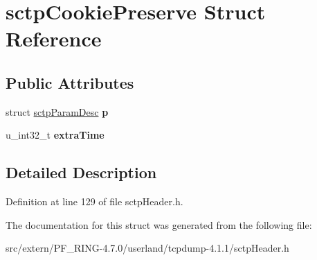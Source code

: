 \hypertarget{structsctp_cookie_preserve}{
\section{sctpCookiePreserve Struct Reference}
\label{structsctp_cookie_preserve}
}
\subsection*{Public Attributes}
\begin{DoxyCompactItemize}
\item 
\hypertarget{structsctp_cookie_preserve_aec11f9dd1f0b9243c11c99002ec5e2db}{
struct \hyperlink{structsctp_param_desc}{sctpParamDesc} {\bfseries p}}
\label{structsctp_cookie_preserve_aec11f9dd1f0b9243c11c99002ec5e2db}

\item 
\hypertarget{structsctp_cookie_preserve_a63d689d972550c54e62849e5b98fce91}{
u\_\-int32\_\-t {\bfseries extraTime}}
\label{structsctp_cookie_preserve_a63d689d972550c54e62849e5b98fce91}

\end{DoxyCompactItemize}


\subsection{Detailed Description}


Definition at line 129 of file sctpHeader.h.



The documentation for this struct was generated from the following file:\begin{DoxyCompactItemize}
\item 
src/extern/PF\_\-RING-\/4.7.0/userland/tcpdump-\/4.1.1/sctpHeader.h\end{DoxyCompactItemize}
